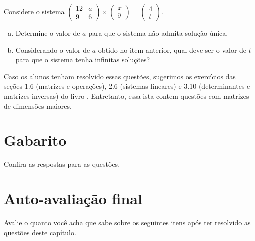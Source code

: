 \documentclass[main.tex]{subfiles}
\begin{document}
\begin{adicional}
Considere o sistema $\begin{pmatrix}12 & a \\ 9 & 6\end{pmatrix} \times \begin{pmatrix}x \\ y\end{pmatrix} = \begin{pmatrix}4 \\ t\end{pmatrix}$.
\begin{enumerate}[a)]
\item Determine o valor de $a$ para que o sistema não admita solução única.
\item Considerando o valor de $a$ obtido no item anterior, qual deve ser o valor de $t$ para que o sistema tenha infinitas soluções?
\end{enumerate}
\end{adicional}

Caso os alunos tenham resolvido essas questões, sugerimos os exercícios das seções 1.6 (matrizes e operações), 2.6 (sistemas lineares) e 3.10 (determinantes e matrizes inversas) do livro . Entretanto, essa ista contem questões com matrizes de dimensões maiores.

\paraAmbos


\newpage

\section{Gabarito}

Confira as respostas para as questões.

\imprimeGabarito

\paraAlunos

\section{Auto-avaliação final}

Avalie o quanto você acha que sabe sobre os seguintes itens após ter resolvido as questões deste capítulo.
\end{document}
